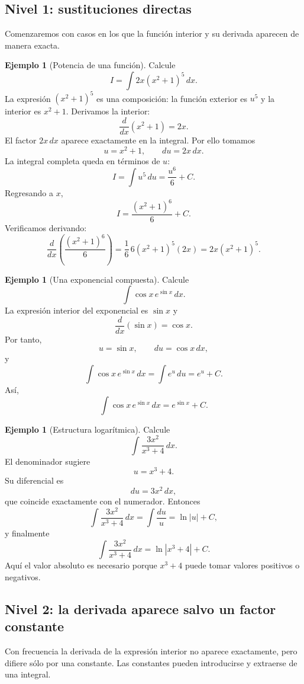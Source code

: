 \documentclass[12pt]{article}
\theoremstyle{definition}\newtheorem{definicion}[teorema]{Definición}\newtheorem{ejemplo}[teorema]{Ejemplo}\newtheorem{ejercicio}[teorema]{Ejercicio}
\theoremstyle{remark}\newtheorem*{observacion}{Observación}\newtheorem*{advertencia}{Advertencia}\newtheorem*{estrategia}{Estrategia}
\begin{document}
\subsection{Nivel 1: sustituciones directas}

Comenzaremos con casos en los que la función interior y su derivada aparecen de manera exacta.

\begin{ejemplo}[Potencia de una función]
Calcule
\[
I=\int 2x(x^2+1)^5\,dx.
\]
La expresión $(x^2+1)^5$ es una composición: la función exterior es $u^5$ y la interior es $x^2+1$. Derivamos la interior:
\[
\frac{d}{dx}(x^2+1)=2x.
\]
El factor $2x\,dx$ aparece exactamente en la integral. Por ello tomamos
\[
u=x^2+1,\qquad du=2x\,dx.
\]
La integral completa queda en términos de $u$:
\[
I=\int u^5\,du=\frac{u^6}{6}+C.
\]
Regresando a $x$,
\[
\boxed{I=\frac{(x^2+1)^6}{6}+C.}
\]
Verificamos derivando:
\[
\frac{d}{dx}\left(\frac{(x^2+1)^6}{6}\right)
=\frac16\,6(x^2+1)^5(2x)=2x(x^2+1)^5.
\]
\end{ejemplo}

\begin{ejemplo}[Una exponencial compuesta]
Calcule
\[
\int \cos x\,e^{\sin x}\,dx.
\]
La expresión interior del exponencial es $\sin x$ y
\[
\frac{d}{dx}(\sin x)=\cos x.
\]
Por tanto,
\[
u=\sin x,\qquad du=\cos x\,dx,
\]
y
\[
\int \cos x\,e^{\sin x}\,dx=\int e^u\,du=e^u+C.
\]
Así,
\[
\boxed{\int \cos x\,e^{\sin x}\,dx=e^{\sin x}+C.}
\]
\end{ejemplo}

\begin{ejemplo}[Estructura logarítmica]
Calcule
\[
\int\frac{3x^2}{x^3+4}\,dx.
\]
El denominador sugiere
\[
u=x^3+4.
\]
Su diferencial es
\[
du=3x^2\,dx,
\]
que coincide exactamente con el numerador. Entonces
\[
\int\frac{3x^2}{x^3+4}\,dx=\int\frac{du}{u}=\ln|u|+C,
\]
y finalmente
\[
\boxed{\int\frac{3x^2}{x^3+4}\,dx=\ln|x^3+4|+C.}
\]
Aquí el valor absoluto es necesario porque $x^3+4$ puede tomar valores positivos o negativos.
\end{ejemplo}

\subsection{Nivel 2: la derivada aparece salvo un factor constante}

Con frecuencia la derivada de la expresión interior no aparece exactamente, pero difiere sólo por una constante. Las constantes pueden introducirse y extraerse de una integral.
\end{document}
